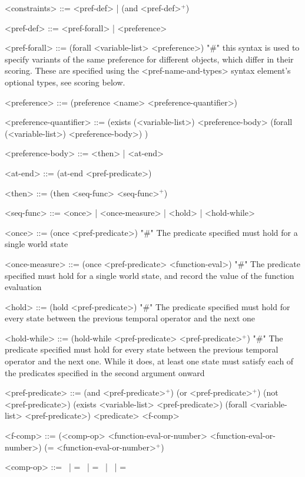 \documentclass{article}
\begin{document}
\begin{grammar}
<constraints> ::= <pref-def> | (and <pref-def>$^+$)
    
<pref-def> ::= <pref-forall> | <preference> 

<pref-forall> ::= (forall <variable-list> <preference>) "#" this syntax is used to specify variants of the same preference for different objects, which differ in their scoring. These are specified using the <pref-name-and-types> syntax element's optional types, see scoring below.
    
<preference> ::= (preference <name> <preference-quantifier>)

<preference-quantifier> ::= (exists (<variable-list>) <preference-body> 
\alt  (forall (<variable-list>) <preference-body>)
) 

<preference-body> ::=  <then> | <at-end>

<at-end> ::= (at-end <pref-predicate>)

<then> ::= (then <seq-func> <seq-func>$^+$) 

<seq-func> ::= <once> | <once-measure> | <hold> | <hold-while>

<once> ::= (once <pref-predicate>) "#" The predicate specified must hold for a single world state

<once-measure> ::= (once <pref-predicate> <function-eval>) "#" The predicate specified must hold for a single world state, and record the value of the function evaluation

<hold> ::= (hold <pref-predicate>) "#" The predicate specified must hold for every state between the previous temporal operator and the next one

<hold-while> ::= (hold-while <pref-predicate> <pref-predicate>$^+$) "#" The predicate specified must hold for every state between the previous temporal operator and the next one. While it does, at least one state must satisfy each of the predicates specified in the second argument onward

<pref-predicate> ::= (and <pref-predicate>$^+$) \alt
    (or <pref-predicate>$^+$) \alt
    (not <pref-predicate>) \alt
    (exists <variable-list> <pref-predicate>) \alt
    (forall <variable-list> <pref-predicate>) \alt
    <predicate> \alt
    <f-comp>



<f-comp> ::= (<comp-op> <function-eval-or-number> <function-eval-or-number>) \alt
    (= <function-eval-or-number>$^+$)
    
<comp-op> ::=  \textlangle \ | \textlangle = \ | = \ | \textrangle \ | \textrangle =


\end{grammar}
\end{document}
